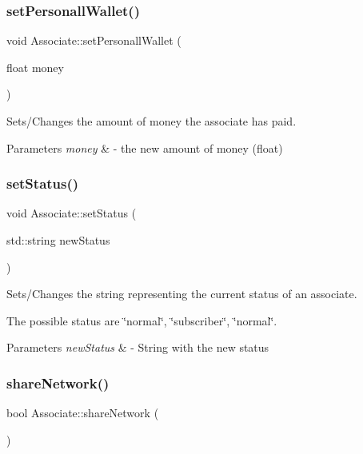 \subsubsection{\texorpdfstring{set\+Personall\+Wallet()}{setPersonallWallet()}}
{\footnotesize\ttfamily void Associate\+::set\+Personall\+Wallet (\begin{DoxyParamCaption}\item[{float}]{money }\end{DoxyParamCaption})}



Sets/\+Changes the amount of money the associate has paid. 


\begin{DoxyParams}{Parameters}
{\em money} & -\/ the new amount of money (float) \\
\hline
\end{DoxyParams}
\mbox{\label{classAssociate_af44a5e1cc41845a60f17a4d23352448d}} 
\subsubsection{\texorpdfstring{set\+Status()}{setStatus()}}
{\footnotesize\ttfamily void Associate\+::set\+Status (\begin{DoxyParamCaption}\item[{std\+::string}]{new\+Status }\end{DoxyParamCaption})}



Sets/\+Changes the string representing the current status of an associate. 

The possible status are \char`\"{}normal\char`\"{}, \char`\"{}subscriber\char`\"{}, \char`\"{}normal\char`\"{}.


\begin{DoxyParams}{Parameters}
{\em new\+Status} & -\/ String with the new status \\
\hline
\end{DoxyParams}
\mbox{\label{classAssociate_a9b836ab2c289e4fd8778c2fe01db6dfe}} 
\subsubsection{\texorpdfstring{share\+Network()}{shareNetwork()}}
{\footnotesize\ttfamily bool Associate\+::share\+Network (\begin{DoxyParamCaption}{ }\end{DoxyParamCaption})}



